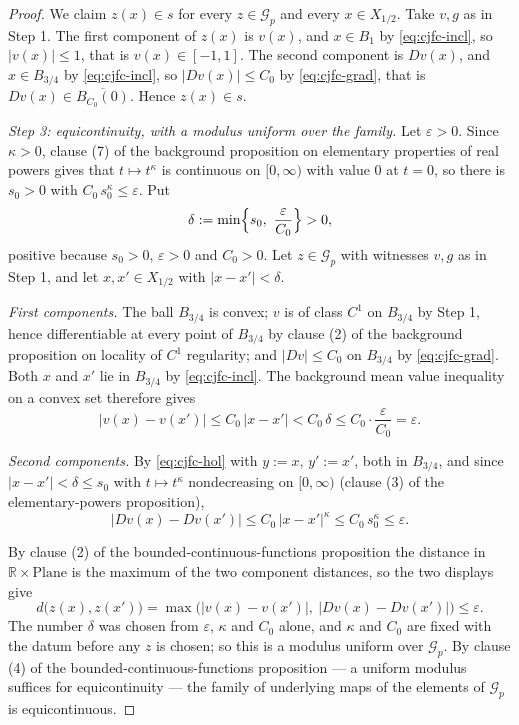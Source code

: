 \begin{proof}
We claim $z(x)\in s$ for every $z\in\mathcal{G}_p$ and every $x\in X_{1/2}$.  Take $v,g$ as in
Step 1.  The first component of $z(x)$ is $v(x)$, and $x\in B_1$ by \eqref{eq:cjfc-incl}, so
$\lvert v(x)\rvert\le1$, that is $v(x)\in[-1,1]$.  The second component is $Dv(x)$, and
$x\in B_{3/4}$ by \eqref{eq:cjfc-incl}, so $\lvert Dv(x)\rvert\le C_0$ by \eqref{eq:cjfc-grad},
that is $Dv(x)\in\overline{B_{C_0}(0)}$.  Hence $z(x)\in s$.

\medskip\noindent\emph{Step 3: equicontinuity, with a modulus uniform over the family.}
Let $\varepsilon>0$.  Since $\kappa>0$, clause (7) of the background proposition on elementary
properties of real powers gives that $t\mapsto t^{\kappa}$ is continuous on $[0,\infty)$ with
value $0$ at $t=0$, so there is $s_0>0$ with $C_0\,s_0^{\kappa}\le\varepsilon$.  Put
\[
  \delta:=\min\Bigl\{s_0,\ \frac{\varepsilon}{C_0}\Bigr\}>0 ,
\]
positive because $s_0>0$, $\varepsilon>0$ and $C_0>0$.  Let $z\in\mathcal{G}_p$ with witnesses
$v,g$ as in Step 1, and let $x,x'\in X_{1/2}$ with $\lvert x-x'\rvert<\delta$.

\emph{First components.}  The ball $B_{3/4}$ is convex; $v$ is of class $C^1$ on $B_{3/4}$ by
Step 1, hence differentiable at every point of $B_{3/4}$ by clause (2) of the background
proposition on locality of $C^1$ regularity; and $\lvert Dv\rvert\le C_0$ on $B_{3/4}$ by
\eqref{eq:cjfc-grad}.  Both $x$ and $x'$ lie in $B_{3/4}$ by \eqref{eq:cjfc-incl}.  The
background mean value inequality on a convex set therefore gives
\[
  \lvert v(x)-v(x')\rvert\le C_0\,\lvert x-x'\rvert<C_0\,\delta
  \le C_0\cdot\frac{\varepsilon}{C_0}=\varepsilon .
\]

\emph{Second components.}  By \eqref{eq:cjfc-hol} with $y:=x$, $y':=x'$, both in $B_{3/4}$, and
since $\lvert x-x'\rvert<\delta\le s_0$ with $t\mapsto t^{\kappa}$ nondecreasing on $[0,\infty)$
(clause (3) of the elementary-powers proposition),
\[
  \lvert Dv(x)-Dv(x')\rvert\le C_0\,\lvert x-x'\rvert^{\kappa}\le C_0\,s_0^{\kappa}\le\varepsilon .
\]

By clause (2) of the bounded-continuous-functions proposition the distance in
$\mathbb{R}\times\mathrm{Plane}$ is the maximum of the two component distances, so the two
displays give
\[
  d\bigl(z(x),z(x')\bigr)
  =\max\bigl(\lvert v(x)-v(x')\rvert,\ \lvert Dv(x)-Dv(x')\rvert\bigr)\le\varepsilon .
\]
The number $\delta$ was chosen from $\varepsilon$, $\kappa$ and $C_0$ alone, and $\kappa$ and
$C_0$ are fixed with the datum before any $z$ is chosen; so this is a modulus uniform over
$\mathcal{G}_p$.  By clause (4) of the bounded-continuous-functions proposition --- a uniform
modulus suffices for equicontinuity --- the family of underlying maps of the elements of
$\mathcal{G}_p$ is equicontinuous.


\end{proof}
